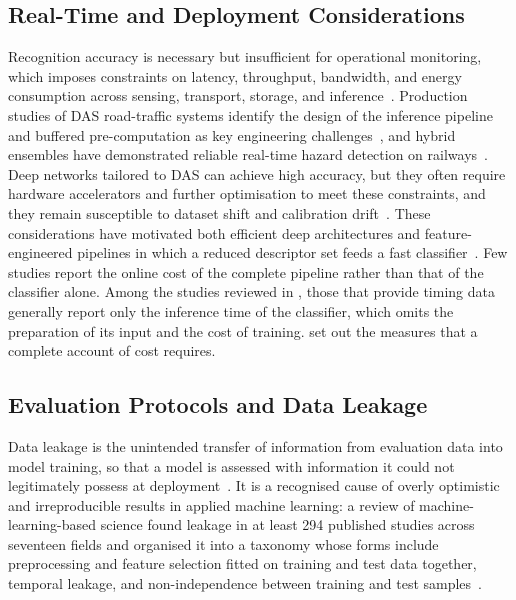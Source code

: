 \subsection{Real-Time and Deployment Considerations}
\label{sec:chap2DASdeployment}
Recognition accuracy is necessary but insufficient for operational monitoring, which imposes constraints on latency, throughput, bandwidth, and energy consumption across sensing, transport, storage, and inference~\cite{deng2025roadtraffic}. Production studies of DAS road-traffic systems identify the design of the inference pipeline and buffered pre-computation as key engineering challenges~\cite{deng2025roadtraffic}, and hybrid ensembles have demonstrated reliable real-time hazard detection on railways~\cite{yurekli2025railway}. Deep networks tailored to DAS can achieve high accuracy, but they often require hardware accelerators and further optimisation to meet these constraints, and they remain susceptible to dataset shift and calibration drift~\cite{shi2025benchmarking}. These considerations have motivated both efficient deep architectures and feature-engineered pipelines in which a reduced descriptor set feeds a fast classifier~\cite{shen2024abnormal,kozmin2025wavelet}. Few studies report the online cost of the complete pipeline rather than that of the classifier alone. Among the studies reviewed in , those that provide timing data generally report only the inference time of the classifier, which omits the preparation of its input and the cost of training.  set out the measures that a complete account of cost requires.

\subsection{Evaluation Protocols and Data Leakage}
\label{sec:chap2Leakage}
Data leakage is the unintended transfer of information from evaluation data into model training, so that a model is assessed with information it could not legitimately possess at deployment~\cite{kaufman2012leakage}. It is a recognised cause of overly optimistic and irreproducible results in applied machine learning: a review of machine-learning-based science found leakage in at least 294 published studies across seventeen fields and organised it into a taxonomy whose forms include preprocessing and feature selection fitted on training and test data together, temporal leakage, and non-independence between training and test samples~\cite{kapoor2023leakage}.

